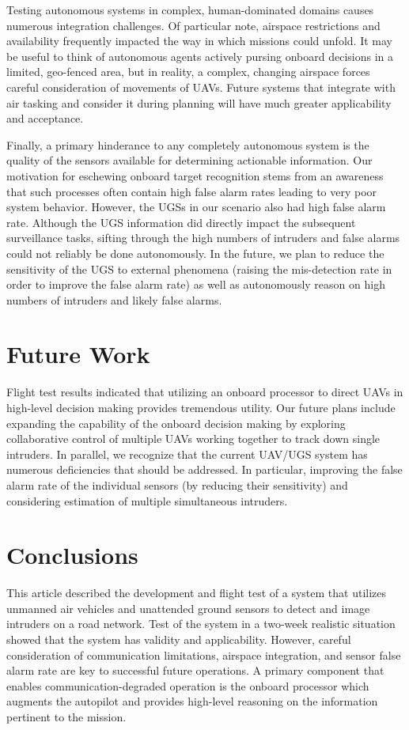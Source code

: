 \documentclass[letterpaper, 12 pt, conference]{ieeeconf}  %
\theoremstyle{definition}
\begin{document}
Testing autonomous systems in complex, human-dominated domains causes numerous integration challenges. Of particular note, airspace restrictions and availability frequently impacted the way in which missions could unfold. It may be useful to think of autonomous agents actively pursing onboard decisions in a limited, geo-fenced area, but in reality, a complex, changing airspace forces careful consideration of movements of UAVs. Future systems that integrate with air tasking and consider it during planning will have much greater applicability and acceptance.

Finally, a primary hinderance to any completely autonomous system is the quality of the sensors available for determining actionable information. Our motivation for eschewing onboard target recognition stems from an awareness that such processes often contain high false alarm rates leading to very poor system behavior. However, the UGSs in our scenario also had high false alarm rate. Although the UGS information did directly impact the subsequent surveillance tasks, sifting through the high numbers of intruders and false alarms could not reliably be done autonomously. In the future, we plan to reduce the sensitivity of the UGS to external phenomena (raising the mis-detection rate in order to improve the false alarm rate) as well as autonomously reason on high numbers of intruders and likely false alarms.

\section{Future Work}
Flight test results indicated that utilizing an onboard processor to direct UAVs in high-level decision making provides tremendous utility. Our future plans include expanding the capability of the onboard decision making by exploring collaborative control of multiple UAVs working together to track down single intruders. In parallel, we recognize that the current UAV/UGS system has numerous deficiencies that should be addressed. In particular, improving the false alarm rate of the individual sensors (by reducing their sensitivity) and considering estimation of multiple simultaneous intruders.

\section{Conclusions}
This article described the development and flight test of a system that utilizes unmanned air vehicles and unattended ground sensors to detect and image intruders on a road network. Test of the system in a two-week realistic situation showed that the system has validity and applicability. However, careful consideration of communication limitations, airspace integration, and sensor false alarm rate are key to successful future operations. A primary component that enables communication-degraded operation is the onboard processor which augments the autopilot and provides high-level reasoning on the information pertinent to the mission.
\end{document}
